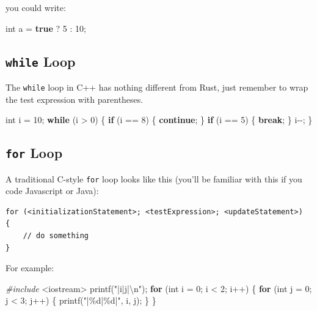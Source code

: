 \documentclass[
]{book}
\newenvironment{Shaded}{\begin{snugshade}}{\end{snugshade}}
\newcommand{\ControlFlowTok}[1]{\textcolor[rgb]{0.13,0.29,0.53}{\textbf{#1}}}
\newcommand{\DataTypeTok}[1]{\textcolor[rgb]{0.13,0.29,0.53}{#1}}
\newcommand{\DecValTok}[1]{\textcolor[rgb]{0.00,0.00,0.81}{#1}}
\newcommand{\ImportTok}[1]{#1}
\newcommand{\KeywordTok}[1]{\textcolor[rgb]{0.13,0.29,0.53}{\textbf{#1}}}
\newcommand{\NormalTok}[1]{#1}
\newcommand{\PreprocessorTok}[1]{\textcolor[rgb]{0.56,0.35,0.01}{\textit{#1}}}
\newcommand{\SpecialCharTok}[1]{\textcolor[rgb]{0.00,0.00,0.00}{#1}}
\newcommand{\StringTok}[1]{\textcolor[rgb]{0.31,0.60,0.02}{#1}}
\begin{document}
you could write:

\begin{Shaded}
\begin{Highlighting}[]
\DataTypeTok{int}\NormalTok{ a = }\KeywordTok{true}\NormalTok{ ? }\DecValTok{5}\NormalTok{ : }\DecValTok{10}\NormalTok{;}
\end{Highlighting}
\end{Shaded}

\hypertarget{while-loop}{%
\subsection{\texorpdfstring{\texttt{while} Loop}{while Loop}}\label{while-loop}}

The \texttt{while} loop in C++ has nothing different from Rust, just remember to wrap the test expression with parentheses.

\begin{Shaded}
\begin{Highlighting}[]
\DataTypeTok{int}\NormalTok{ i = }\DecValTok{10}\NormalTok{;}
\ControlFlowTok{while}\NormalTok{ (i \textgreater{} }\DecValTok{0}\NormalTok{)}
\NormalTok{\{}
    \ControlFlowTok{if}\NormalTok{ (i == }\DecValTok{8}\NormalTok{)}
\NormalTok{    \{}
        \ControlFlowTok{continue}\NormalTok{;}
\NormalTok{    \}}
    \ControlFlowTok{if}\NormalTok{ (i == }\DecValTok{5}\NormalTok{)}
\NormalTok{    \{}
        \ControlFlowTok{break}\NormalTok{;}
\NormalTok{    \}}
\NormalTok{    i{-}{-};}
\NormalTok{\}}
\end{Highlighting}
\end{Shaded}

\hypertarget{for-loop}{%
\subsection{\texorpdfstring{\texttt{for} Loop}{for Loop}}\label{for-loop}}

A traditional C-style \texttt{for} loop looks like this (you'll be familiar with this if you code Javascript or Java):

\begin{verbatim}
for (<initializationStatement>; <testExpression>; <updateStatement>)
{
    // do something
}
\end{verbatim}

For example:

\begin{Shaded}
\begin{Highlighting}[]
\PreprocessorTok{\#include }\ImportTok{\textless{}iostream\textgreater{}}
\NormalTok{printf(}\StringTok{"|i|j|}\SpecialCharTok{\textbackslash{}n}\StringTok{"}\NormalTok{);}
\ControlFlowTok{for}\NormalTok{ (}\DataTypeTok{int}\NormalTok{ i = }\DecValTok{0}\NormalTok{; i \textless{} }\DecValTok{2}\NormalTok{; i++)}
\NormalTok{\{}
    \ControlFlowTok{for}\NormalTok{ (}\DataTypeTok{int}\NormalTok{ j = }\DecValTok{0}\NormalTok{; j \textless{} }\DecValTok{3}\NormalTok{; j++)}
\NormalTok{    \{}
\NormalTok{        printf(}\StringTok{"|}\SpecialCharTok{\%d}\StringTok{|}\SpecialCharTok{\%d}\StringTok{|"}\NormalTok{, i, j);}
\NormalTok{    \}}
\NormalTok{\}}
\end{Highlighting}
\end{Shaded}
\end{document}
